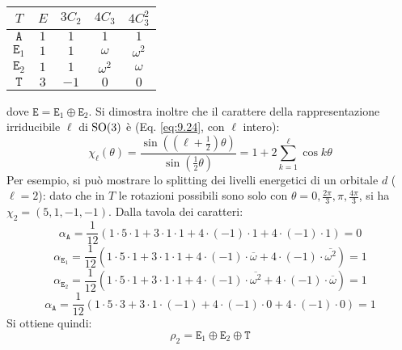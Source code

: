 \begin{table}[H]
	\centering
	\begin{tabular}{c|cccc}
		$ T $ & $ E $ & $ 3C_2 $ & $ 4C_3 $ & $ 4C_3^2 $ \\
		\hline
		$ \mathtt{A} $ & $ 1 $ & $ 1 $ & $ 1 $ & $ 1 $ \\
		$ \mathtt{E}_1 $ & $ 1 $ & $ 1 $ & $ \omega $ & $ \omega^2 $ \\
		$ \mathtt{E}_2 $ & $ 1 $ & $ 1 $ & $ \omega^2 $ & $ \omega $ \\
		$ \mathtt{T} $ & $ 3 $ & $ -1 $ & $ 0 $ & $ 0 $
	\end{tabular}
\end{table}
dove $ \mathtt{E} = \mathtt{E}_1 \oplus \mathtt{E}_2 $. Si dimostra inoltre che il carattere della rappresentazione irriducibile $ \ell $ di $ \mathrm{SO}(3) $ è (Eq. \ref{eq:9.24}, con $ \ell $ intero):
\begin{equation}
	\chi_{\ell}(\theta) = \frac{\sin \left( \left( \ell + \frac{1}{2} \right) \theta \right)}{\sin \left( \frac{1}{2} \theta \right)} = 1 + 2 \sum_{k = 1}^{\ell} \cos k\theta
	\label{eq:8.37}
\end{equation}
Per esempio, si può mostrare lo splitting dei livelli energetici di un orbitale $ d $ ($ \ell = 2 $): dato che in $ T $ le rotazioni possibili sono solo con $ \theta = 0, \frac{2\pi}{3}, \pi, \frac{4\pi}{3} $, si ha $ \chi_2 = (5,1,-1,-1) $. Dalla tavola dei caratteri:
\begin{equation*}
	\alpha_{\mathtt{A}} = \frac{1}{12} (1 \cdot 5 \cdot 1 + 3 \cdot 1 \cdot 1 + 4 \cdot (-1) \cdot 1 + 4 \cdot (-1) \cdot 1) = 0
\end{equation*}
\begin{equation*}
	\alpha_{\mathtt{E}_1} = \frac{1}{12} (1 \cdot 5 \cdot 1 + 3 \cdot 1 \cdot 1 + 4 \cdot (-1) \cdot \overline{\omega} + 4 \cdot (-1) \cdot \overline{\omega^2}) = 1
\end{equation*}
\begin{equation*}
	\alpha_{\mathtt{E}_2} = \frac{1}{12} (1 \cdot 5 \cdot 1 + 3 \cdot 1 \cdot 1 + 4 \cdot (-1) \cdot \overline{\omega^2} + 4 \cdot (-1) \cdot \overline{\omega}) = 1
\end{equation*}
\begin{equation*}
	\alpha_{\mathtt{A}} = \frac{1}{12} (1 \cdot 5 \cdot 3 + 3 \cdot 1 \cdot (-1) + 4 \cdot (-1) \cdot 0 + 4 \cdot (-1) \cdot 0) = 1
\end{equation*}
Si ottiene quindi:
\begin{equation*}
	\rho_2 = \mathtt{E}_1 \oplus \mathtt{E}_2 \oplus \mathtt{T}
\end{equation*}
